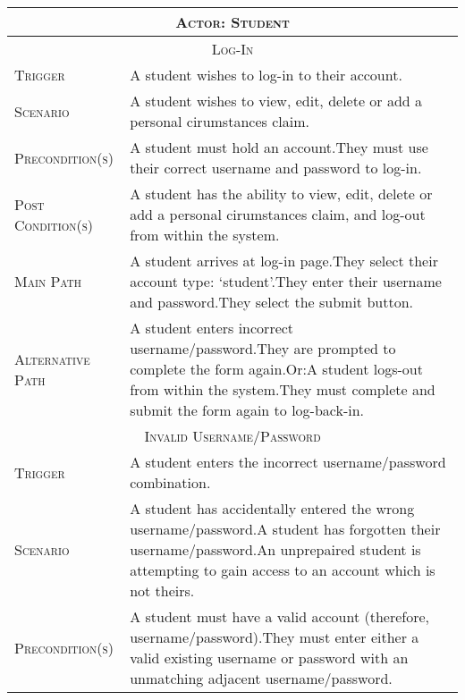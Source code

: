 \documentclass[11pt, english]{article}
\begin{document}
	\begin{center}
		\scriptsize
	\begin{longtable}{p{3cm}|p{9cm}}
		\hline
		\hline
		\multicolumn{2}{c}{\textsc{Actor: Student}}\\
		\hline
		\hline
		\multicolumn{2}{c}{\textsc{Log-In}}\\
		\hline
		\textsc{Trigger} & A student wishes to log-in to their account.\\
		\textsc{Scenario} & A student wishes to view, edit, delete or add a personal cirumstances claim.\\
		\textsc{Precondition(s)} & A student must hold an account.\newline They must use their correct username and password to log-in.\\
		\textsc{Post Condition(s)} & A student has the ability to view, edit, delete or add a personal cirumstances claim, and log-out from within the system.\\
		\textsc{Main Path} & A student arrives at log-in page.\newline They select their account type: `student'.\newline They enter their username and password.\newline They select the submit button.\\
		\textsc{Alternative Path} & A student enters incorrect username/password.\newline They are prompted to complete the form again.\newline Or:\newline A student logs-out from within the system.\newline They must complete and submit the form again to log-back-in.\\
		\hline
		\multicolumn{2}{c}{\textsc{Invalid Username/Password}}\\
		\hline
		\textsc{Trigger} & A student enters the incorrect username/password combination.\\
		\textsc{Scenario} & A student has accidentally entered the wrong username/password.\newline A student has forgotten their username/password.\newline An unprepaired student is attempting to gain access to an account which is not theirs.\\
		\textsc{Precondition(s)} & A student must have a valid account (therefore, username/password).\newline They must enter either a valid existing username or password with an unmatching adjacent username/password.\\

\end{longtable}
\end{center}
\end{document}
